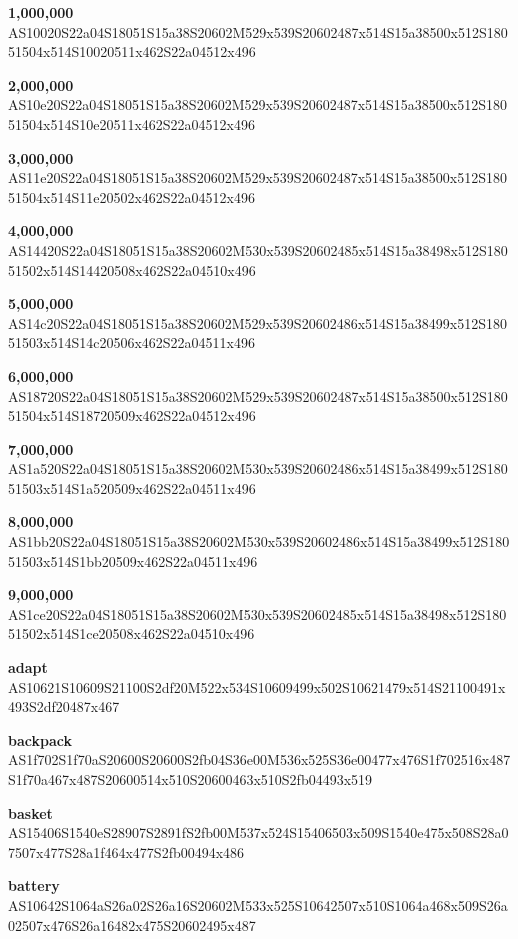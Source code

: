\documentclass{article}
\begin{document}
\begin{glossary}

\textbf{1,000,000}\\
AS10020S22a04S18051S15a38S20602M529x539S20602487x514S15a38500x512S18051504x514S10020511x462S22a04512x496

\textbf{2,000,000}\\
AS10e20S22a04S18051S15a38S20602M529x539S20602487x514S15a38500x512S18051504x514S10e20511x462S22a04512x496

\textbf{3,000,000}\\
AS11e20S22a04S18051S15a38S20602M529x539S20602487x514S15a38500x512S18051504x514S11e20502x462S22a04512x496

\textbf{4,000,000}\\
AS14420S22a04S18051S15a38S20602M530x539S20602485x514S15a38498x512S18051502x514S14420508x462S22a04510x496

\textbf{5,000,000}\\
AS14c20S22a04S18051S15a38S20602M529x539S20602486x514S15a38499x512S18051503x514S14c20506x462S22a04511x496

\textbf{6,000,000}\\
AS18720S22a04S18051S15a38S20602M529x539S20602487x514S15a38500x512S18051504x514S18720509x462S22a04512x496

\textbf{7,000,000}\\
AS1a520S22a04S18051S15a38S20602M530x539S20602486x514S15a38499x512S18051503x514S1a520509x462S22a04511x496

\textbf{8,000,000}\\
AS1bb20S22a04S18051S15a38S20602M530x539S20602486x514S15a38499x512S18051503x514S1bb20509x462S22a04511x496

\textbf{9,000,000}\\
AS1ce20S22a04S18051S15a38S20602M530x539S20602485x514S15a38498x512S18051502x514S1ce20508x462S22a04510x496

\textbf{adapt}\\
AS10621S10609S21100S2df20M522x534S10609499x502S10621479x514S21100491x493S2df20487x467

\textbf{backpack}\\
AS1f702S1f70aS20600S20600S2fb04S36e00M536x525S36e00477x476S1f702516x487S1f70a467x487S20600514x510S20600463x510S2fb04493x519

\textbf{basket}\\
AS15406S1540eS28907S2891fS2fb00M537x524S15406503x509S1540e475x508S28a07507x477S28a1f464x477S2fb00494x486

\textbf{battery}\\
AS10642S1064aS26a02S26a16S20602M533x525S10642507x510S1064a468x509S26a02507x476S26a16482x475S20602495x487


\end{glossary}
\end{document}
